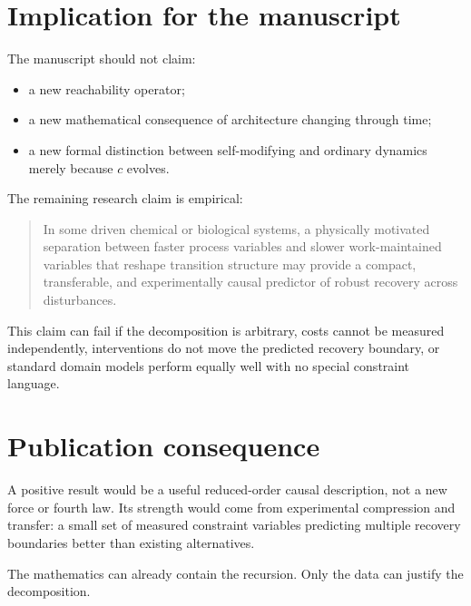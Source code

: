 \documentclass[11pt]{article}
\begin{document}
\section{Implication for the manuscript}

The manuscript should not claim:

\begin{itemize}
\item a new reachability operator;
\item a new mathematical consequence of architecture changing through time;
\item a new formal distinction between self-modifying and ordinary dynamics merely because $c$ evolves.
\end{itemize}

The remaining research claim is empirical:

\begin{quote}
In some driven chemical or biological systems, a physically motivated separation between faster process variables and slower work-maintained variables that reshape transition structure may provide a compact, transferable, and experimentally causal predictor of robust recovery across disturbances.
\end{quote}

This claim can fail if the decomposition is arbitrary, costs cannot be measured independently, interventions do not move the predicted recovery boundary, or standard domain models perform equally well with no special constraint language.

\section{Publication consequence}

A positive result would be a useful reduced-order causal description, not a new force or fourth law. Its strength would come from experimental compression and transfer: a small set of measured constraint variables predicting multiple recovery boundaries better than existing alternatives.

The mathematics can already contain the recursion. Only the data can justify the decomposition.
\end{document}
